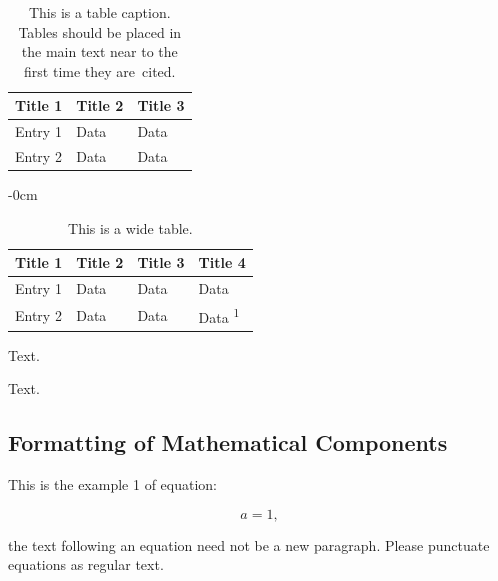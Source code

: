 \documentclass[energies,article,submit,pdftex,moreauthors]{Definitions/mdpi}
\begin{document}
\begin{table}[H] 
\caption{This is a table caption. Tables should be placed in the main text near to the first time they are~cited.\label{tab1}}
\begin{tabularx}{\textwidth}{CCC}
\toprule
\textbf{Title 1}	& \textbf{Title 2}	& \textbf{Title 3}\\
\midrule
Entry 1		& Data			& Data\\
Entry 2		& Data			& Data\\
\bottomrule
\end{tabularx}
\end{table}
\unskip

\begin{table}[H]
\caption{This is a wide table.\label{tab2}}
	\begin{adjustwidth}{-\extralength}{0cm}
		\begin{tabularx}{\fulllength}{CCCC}
			\toprule
			\textbf{Title 1}	& \textbf{Title 2}	& \textbf{Title 3}     & \textbf{Title 4}\\
			\midrule
			Entry 1		& Data			& Data			& Data\\
			Entry 2		& Data			& Data			& Data \textsuperscript{1}\\
			\bottomrule
		\end{tabularx}
	\end{adjustwidth}
\end{table}


Text.

Text.

\subsection{Formatting of Mathematical Components}

This is the example 1 of equation:
\begin{linenomath}
\begin{equation}
a = 1,
\end{equation}
\end{linenomath}
the text following an equation need not be a new paragraph. Please punctuate equations as regular text.
\end{document}
